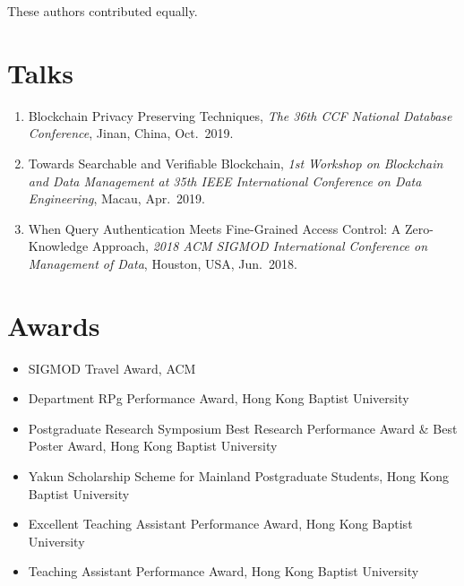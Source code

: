\documentclass{mycv}
\begin{document}

{
\footnotesize%
\textsuperscript{\textdagger}These authors contributed equally.
}

\section{Talks}

\begin{enumerate}
  \item Blockchain Privacy Preserving Techniques, \emph{The 36th CCF National Database Conference}, Jinan, China, Oct.~2019.
  \item Towards Searchable and Verifiable Blockchain, \emph{1st Workshop on Blockchain and Data Management at 35th IEEE International Conference on Data Engineering}, Macau, Apr.~2019.
  \item When Query Authentication Meets Fine-Grained Access Control: A Zero-Knowledge Approach, \emph{2018 ACM SIGMOD International Conference on Management of Data}, Houston, USA, Jun.~2018.
\end{enumerate}

\section{Awards}

\begin{itemize}
  \item SIGMOD Travel Award, ACM 
  \item Department RPg Performance Award, Hong Kong Baptist University 
  \item Postgraduate Research Symposium Best Research Performance Award \& Best Poster Award, Hong Kong Baptist University 
  \item Yakun Scholarship Scheme for Mainland Postgraduate Students, Hong Kong Baptist University 
  \item Excellent Teaching Assistant Performance Award, Hong Kong Baptist University 
  \item Teaching Assistant Performance Award, Hong Kong Baptist University 
\end{itemize}
\end{document}
